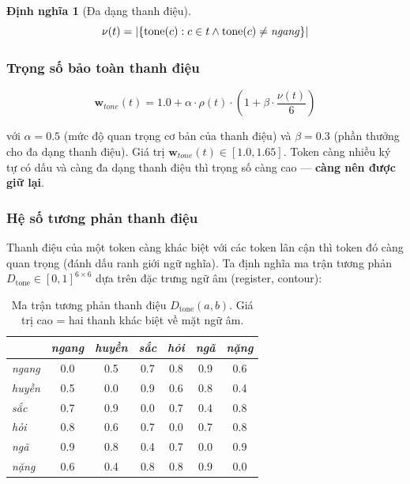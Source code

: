 \documentclass[12pt,a4paper]{article}
\newtheorem{definition}{Định nghĩa}[section]
\newcommand{\tone}[1]{\textit{#1}}          %
\newcommand{\weight}[1]{\mathbf{w}_{#1}}     %
\begin{document}
\begin{definition}[Đa dạng thanh điệu]
$$\nu(t) = \left|\{\text{tone}(c) : c \in t \land \text{tone}(c) \neq \text{\tone{ngang}}\}\right|$$
\end{definition}

\subsubsection{Trọng số bảo toàn thanh điệu}

\begin{equation}\label{eq:tone_weight}
    \weight{tone}(t) = 1.0 + \alpha \cdot \rho(t) \cdot \left(1 + \beta \cdot \frac{\nu(t)}{6}\right)
\end{equation}

với $\alpha = 0.5$ (mức độ quan trọng cơ bản của thanh điệu) và $\beta = 0.3$ (phần thưởng cho đa dạng thanh điệu). Giá trị $\weight{tone}(t) \in [1.0, 1.65]$. Token càng nhiều ký tự có dấu và càng đa dạng thanh điệu thì trọng số càng cao --- \textbf{càng nên được giữ lại}.

\subsubsection{Hệ số tương phản thanh điệu}

Thanh điệu của một token càng khác biệt với các token lân cận thì token đó càng quan trọng (đánh dấu ranh giới ngữ nghĩa). Ta định nghĩa ma trận tương phản $D_{\text{tone}} \in [0,1]^{6 \times 6}$ dựa trên đặc trưng ngữ âm (register, contour):

\begin{table}[H]
\centering
\caption{Ma trận tương phản thanh điệu $D_{\text{tone}}(a, b)$. Giá trị cao = hai thanh khác biệt về mặt ngữ âm.}
\label{tab:tone_matrix}
\begin{tabular}{l|cccccc}
\toprule
 & \tone{ngang} & \tone{huyền} & \tone{sắc} & \tone{hỏi} & \tone{ngã} & \tone{nặng} \\
\midrule
\tone{ngang} & 0.0 & 0.5 & 0.7 & 0.8 & 0.9 & 0.6 \\
\tone{huyền} & 0.5 & 0.0 & 0.9 & 0.6 & 0.8 & 0.4 \\
\tone{sắc}   & 0.7 & 0.9 & 0.0 & 0.7 & 0.4 & 0.8 \\
\tone{hỏi}   & 0.8 & 0.6 & 0.7 & 0.0 & 0.7 & 0.8 \\
\tone{ngã}   & 0.9 & 0.8 & 0.4 & 0.7 & 0.0 & 0.9 \\
\tone{nặng}  & 0.6 & 0.4 & 0.8 & 0.8 & 0.9 & 0.0 \\
\bottomrule
\end{tabular}
\end{table}
\end{document}
